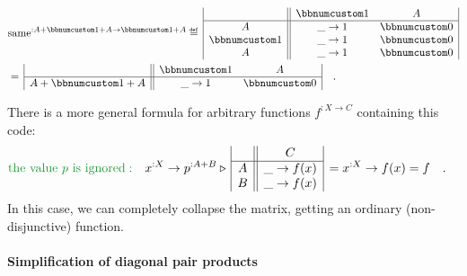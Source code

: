 ~\vspace{-1.4\baselineskip}
\begin{align*}
 & \text{same}^{:A+\bbnum 1+A\rightarrow\bbnum 1+A}\triangleq\,\begin{array}{|c||cc|}
 & \bbnum 1 & A\\
\hline A & \_\rightarrow1 & \bbnum 0\\
\bbnum 1 & \_\rightarrow1 & \bbnum 0\\
A & \_\rightarrow1 & \bbnum 0
\end{array}\\
 & =\,\begin{array}{|c||cc|}
 & \bbnum 1 & A\\
\hline A+\bbnum 1+A & \_\rightarrow1 & \bbnum 0
\end{array}\quad.
\end{align*}
\vspace{-1\baselineskip}

There is a more general formula for arbitrary functions $f^{:X\rightarrow C}$
containing this code:
\begin{align*}
{\color{greenunder}\text{the value }p\text{ is ignored}:}\quad & x^{:X}\rightarrow p^{:A+B}\triangleright\,\begin{array}{|c||c|}
 & C\\
\hline A & \_\rightarrow f(x)\\
B & \_\rightarrow f(x)
\end{array}\,=x^{:X}\rightarrow f(x)=f\quad.
\end{align*}
In this case, we can completely collapse the matrix, getting an ordinary
(non-disjunctive) function.

\paragraph{Simplification of diagonal pair products}

